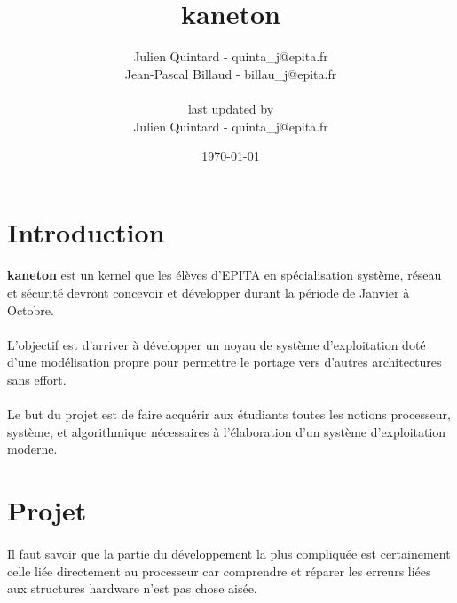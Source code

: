 \documentclass[10pt,a4wide]{article}
\title{kaneton}
\author{Julien Quintard - \small{quinta\_j@epita.fr} \\
        Jean-Pascal Billaud - \small{billau\_j@epita.fr} \\ \\
        \small{last updated by} \\
        Julien Quintard - \small{quinta\_j@epita.fr}}
\date{\today}
\begin{document}
\maketitle

\newpage

\section{Introduction}

\paragraph{}

\textbf{kaneton} est un kernel que les \'el\`eves d'EPITA en sp\'ecialisation
syst\`eme, r\'eseau et s\'ecurit\'e devront concevoir et d\'evelopper durant
la p\'eriode de Janvier \`a Octobre.

\paragraph{}

L'objectif est d'arriver \`a d\'evelopper un noyau de syst\`eme d'exploitation
dot\'e d'une mod\'elisation propre pour permettre le portage vers d'autres
architectures sans effort.

\paragraph{}

Le but du projet est de faire acqu\'erir aux \'etudiants toutes les notions
processeur, syst\`eme, et algorithmique n\'ecessaires \`a l'\'elaboration
d'un syst\`eme d'exploitation moderne.

\newpage

\section{Projet}

\paragraph{}

Il faut savoir que la partie du d\'eveloppement la plus compliqu\'ee est
certainement celle li\'ee directement au processeur car comprendre
et r\'eparer les erreurs li\'ees aux structures hardware n'est pas chose
ais\'ee.

\paragraph{}
\end{document}
